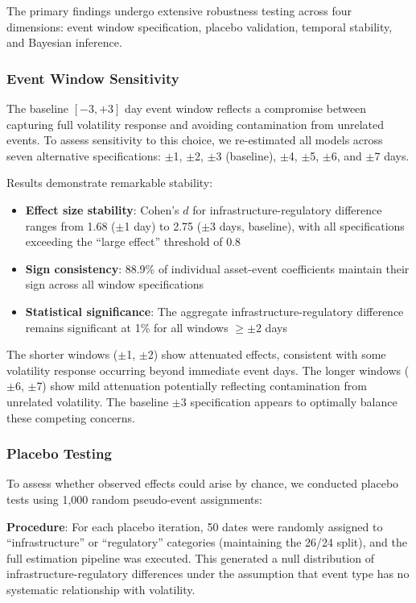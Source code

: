 \documentclass[pdflatex,sn-mathphys-num]{sn-jnl}
\theoremstyle{thmstyleone}
\theoremstyle{thmstyletwo}
\theoremstyle{thmstylethree}
\begin{document}
The primary findings undergo extensive robustness testing across four dimensions: event window specification, placebo validation, temporal stability, and Bayesian inference.

\subsubsection{Event Window Sensitivity}

The baseline $[-3,+3]$ day event window reflects a compromise between capturing full volatility response and avoiding contamination from unrelated events. To assess sensitivity to this choice, we re-estimated all models across seven alternative specifications: $\pm$1, $\pm$2, $\pm$3 (baseline), $\pm$4, $\pm$5, $\pm$6, and $\pm$7 days.

Results demonstrate remarkable stability:
\begin{itemize}[nosep]
\item \textbf{Effect size stability}: Cohen's $d$ for infrastructure-regulatory difference ranges from 1.68 ($\pm$1 day) to 2.75 ($\pm$3 days, baseline), with all specifications exceeding the ``large effect'' threshold of 0.8
\item \textbf{Sign consistency}: 88.9\% of individual asset-event coefficients maintain their sign across all window specifications
\item \textbf{Statistical significance}: The aggregate infrastructure-regulatory difference remains significant at 1\% for all windows $\geq \pm$2 days
\end{itemize}

The shorter windows ($\pm$1, $\pm$2) show attenuated effects, consistent with some volatility response occurring beyond immediate event days. The longer windows ($\pm$6, $\pm$7) show mild attenuation potentially reflecting contamination from unrelated volatility. The baseline $\pm$3 specification appears to optimally balance these competing concerns.

\subsubsection{Placebo Testing}

To assess whether observed effects could arise by chance, we conducted placebo tests using 1,000 random pseudo-event assignments:

\textbf{Procedure}: For each placebo iteration, 50 dates were randomly assigned to ``infrastructure'' or ``regulatory'' categories (maintaining the 26/24 split), and the full estimation pipeline was executed. This generated a null distribution of infrastructure-regulatory differences under the assumption that event type has no systematic relationship with volatility.
\end{document}
